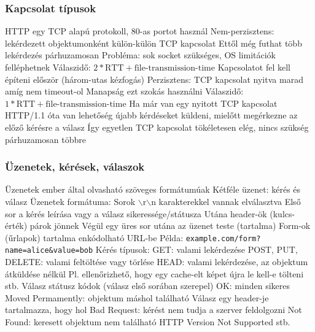 \documentclass[12pt,a4paper]{article}
\begin{document}
\subsubsection{Kapcsolat típusok}

\begin{outline}
	\1 HTTP egy TCP alapú protokoll, 80-as portot használ
	\1 Nem-perzisztens: lekérdezett objektumonként külön-külön TCP kapcsolat
		\2 Ettől még futhat több lekérdezés párhuzamosan
		\2 Probléma: sok socket szükséges, OS limitációk felléphetnek
		\2 Válaszidő: $2*\text{RTT}+\text{file-transmission-time}$
			\3 Kapcsolatot fel kell építeni először (három-utas kézfogás)
	\1 Perzisztens: TCP kapcsolat nyitva marad amíg nem timeout-ol
		\2 Manapság ezt szokás használni
		\2 Válaszidő: $1*\text{RTT}+\text{file-transmission-time}$
			\3 Ha már van egy nyitott TCP kapcsolat
		\2 HTTP/1.1 óta van lehetőség újabb kérdéseket küldeni, mielőtt megérkezne az előző kérésre a válasz
			\3 Így egyetlen TCP kapcsolat tökéletesen elég, nincs szükség párhuzamosan többre
\end{outline}

\subsubsection{Üzenetek, kérések, válaszok}

\begin{outline}
	\1 Üzenetek ember által olvasható szöveges formátumúak
	\1 Kétféle üzenet: kérés és válasz
	\1 Üzenetek formátuma:
		\2 Sorok $\backslash$r$\backslash$n karakterekkel vannak elválasztva
		\2 Első sor a kérés leírása vagy a válasz sikeressége/státusza
		\2 Utána header-ök (kulcs-érték) párok jönnek
		\2 Végül egy üres sor utána az üzenet teste (tartalma)
	\1 Form-ok (űrlapok) tartalma enkódolható URL-be
		\2 Példa: \texttt{example.com/form?name=alice\&value=bob}
	\1 Kérés típusok:
		\2 GET: valami lekérdezése
		\2 POST, PUT, DELETE: valami feltöltése vagy törlése
		\2 HEAD: valami lekérdezése, az objektum átküldése nélkül
			\3 Pl. ellenőrizhető, hogy egy cache-elt képet újra le kell-e tölteni
		\2 stb.
	\1 Válasz státusz kódok (válasz első sorában szerepel)
		 OK: minden sikeres
		 Moved Permamently: objektum máshol található
			\3 Válasz egy header-je tartalmazza, hogy hol
		 Bad Request: kérést nem tudja a szerver feldolgozni
		 Not Found: keresett objektum nem található
		 HTTP Version Not Supported
		\2 stb.
\end{outline}
\end{document}
